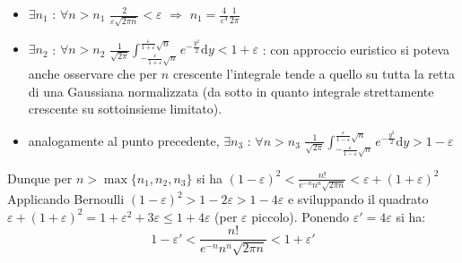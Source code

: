 \documentclass[10pt]{article}
\theoremstyle{plain}
\begin{document}
\begin{itemize}
    \item $\exists n_1$ : $\forall n> n_1$ $\displaystyle \frac{2}{\varepsilon\sqrt{2\pi n}} < \varepsilon$ $\Rightarrow$ $n_1 = \frac{4}{\varepsilon^4}\frac{1}{2\pi}$
    \item $\exists n_2$ : $\forall n> n_2$ $\displaystyle \frac{1}{\sqrt{2\pi}}\int_{- \frac{\varepsilon}{1+\varepsilon}\sqrt{n}}^{\frac{\varepsilon}{1+\varepsilon}\sqrt{n}} e^{\displaystyle - \frac{y^2}{2}} \textrm{d}y < 1+\varepsilon$ : con approccio euristico si poteva anche osservare che per $n$ crescente l'integrale tende a quello su tutta la retta di una Gaussiana normalizzata (da sotto in quanto integrale strettamente crescente su sottoinsieme limitato).
    \item analogamente al punto precedente, $\exists n_3$ : $\forall n> n_3$ $\displaystyle \frac{1}{\sqrt{2\pi}}\int_{- \frac{\varepsilon}{1-\varepsilon}\sqrt{n}}^{\frac{\varepsilon}{1-\varepsilon}\sqrt{n}} e^{\displaystyle - \frac{y^2}{2}} \textrm{d}y > 1-\varepsilon$
\end{itemize}
Dunque per $n > \max\{n_1, n_2, n_3\}$ si ha $\displaystyle (1-\varepsilon)^2 < \frac{n!}{e^{-n} n^n \sqrt{2\pi n}} < \varepsilon + (1+\varepsilon)^2$
\\Applicando Bernoulli $(1-\varepsilon)^2 > 1 - 2\varepsilon > 1 - 4\varepsilon$ e sviluppando il quadrato $\varepsilon + (1+\varepsilon)^2 = 1 + \varepsilon^2 + 3\varepsilon \leq 1 + 4\varepsilon$ (per $\varepsilon$ piccolo). Ponendo $\varepsilon' = 4\varepsilon$ si ha:
\[1 - \varepsilon' < \frac{n!}{e^{-n} n^n \sqrt{2\pi n}} < 1 + \varepsilon'\]
\end{document}
